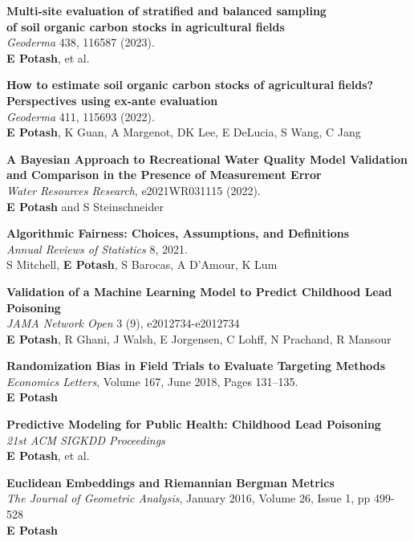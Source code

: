 \documentclass[margin,line]{resume}
\begin{document}
\begin{resume}
        {\bf Multi-site evaluation of stratified and balanced sampling\\of soil organic carbon stocks in agricultural fields}\\
        \textit{Geoderma} 438, 116587 (2023).\\
        \textbf{E Potash}, et al.

        {\bf How to estimate soil organic carbon stocks of agricultural fields?\\Perspectives using ex-ante evaluation}\\
        \textit{Geoderma} 411, 115693 (2022).\\
        \textbf{E Potash}, K Guan, A Margenot, DK Lee, E DeLucia, S Wang, C Jang 

        {\bf A Bayesian Approach to Recreational Water Quality Model Validation\\and Comparison in the Presence of Measurement Error}\\
        \textit{Water Resources Research}, e2021WR031115 (2022).\\
        \textbf{E Potash} and S Steinschneider

        {\bf Algorithmic Fairness: Choices, Assumptions, and Definitions}\\
        \textit{Annual Reviews of Statistics} 8, 2021.\\
        S Mitchell, \textbf{E Potash}, S Barocas, A D'Amour, K Lum

        {\bf Validation of a Machine Learning Model to Predict Childhood Lead \\ Poisoning}\\
        \textit{JAMA Network Open} 3 (9), e2012734-e2012734\\
        \textbf{E Potash}, R Ghani, J Walsh, E Jorgensen, C Lohff, N Prachand, R Mansour

        {\bf Randomization Bias in Field Trials to Evaluate Targeting Methods}\\
        \textit{Economics Letters}, Volume 167, June 2018, Pages 131--135.\\
        \textbf{E Potash}

	{\bf Predictive Modeling for Public Health: Childhood Lead Poisoning} \\
        \textit{21st ACM SIGKDD Proceedings} \\
        \textbf{E Potash}, et al.

	{\bf Euclidean Embeddings and Riemannian Bergman Metrics} \\
        \textit{The Journal of Geometric Analysis}, January 2016, Volume 26, Issue 1, pp 499-528\\
        \textbf{E Potash}


\end{resume}
\end{document}

